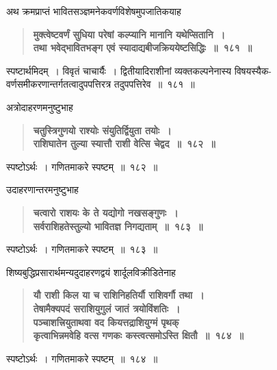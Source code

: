 \documentclass[11pt, openany]{book}
\begin{document}
\begin{sloppypar}
{\small अथ क्रमप्राप्तं भावितसञ्ज्ञमनेकवर्णविशेषमुपजातिकयाह\textendash }

 \label{11.181}
\begin{quote}
{\large \textbf{{\color{purple}मुक्त्वेष्टवर्णं सुधिया परेषां कल्प्यानि मानानि यथेप्सितानि~।\\
तथा भवेद्भावितभङ्ग एवं स्यादाद्यबीजक्रिययेष्टसिद्धिः~॥~१८१~॥}}}
\end{quote}

स्पष्टार्थमिदम्~। विवृतं चाचार्यैः~। द्वितीयादिराशीनां व्यक्तकल्पनेनास्य विषयस्यैक-वर्णसमीकरणान्तर्गतत्वादुपपत्तिरत्र तदुपपत्तिरेव~॥~१८१~॥ 
\vspace{2mm}

{\small अत्रोदाहरणमनुष्टुभाह\textendash }

 \label{11.182}
\begin{quote}
{\large \textbf{{\color{purple}चतुस्त्रिगुणयो राश्योः संयुतिर्द्वियुता तयोः~।\\
राशिघातेन तुल्या स्यात्तौ राशी वेत्सि चेद्वद~॥~१८२~॥}}}
\end{quote}

स्पष्टोऽर्थः~। गणितमाकरे स्पष्टम्~॥~१८२~॥ 
\vspace{2mm}

{\small उदाहरणान्तरमनुष्टुभाह\textendash }

 \label{11.183}
\begin{quote}
{\large \textbf{{\color{purple}चत्वारो राशयः के ते यद्योगो नखसङ्गुणः~।\\
सर्वराशिहतेस्तुल्यो भावितज्ञ निगद्यताम्~॥~१८३~॥}}}
\end{quote}

स्पष्टोऽर्थः~। गणितमाकरे स्पष्टम्~॥~१८३~॥ 
\vspace{2mm}

{\small शिष्यबुद्धिप्रसारार्थमन्यदुदाहरणद्वयं शार्दूलविक्रीडितेनाह\textendash }

 \label{11.184}
\begin{quote}
{\large \textbf{{\color{purple}यौ राशी किल या च राशिनिहतिर्यौ राशिवर्गौ तथा~।\\
तेषामैक्यपदं सराशियुगुलं जातं त्रयोविंशतिः~।\\
पञ्चाशत्त्रियुताथवा वद कियत्तद्राशियुग्मं पृथक्\\
कृत्वाभिन्नमवेहि वत्स गणकः कस्त्वत्समोऽस्ति क्षितौ~॥~१८४~॥}}}
\end{quote}

स्पष्टोऽर्थः~। गणितमाकरे स्पष्टम्~॥~१८४~॥ 
\vspace{2mm}


\end{sloppypar}
\end{document}

